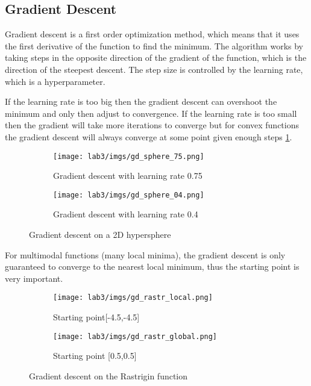 \subsection{Gradient Descent}
\label{sec:gradient-descent}
Gradient descent is a first order optimization method, which means that it uses the first derivative of the function to find the minimum. The algorithm works by taking steps in the opposite direction of the gradient of the function, which is the direction of the steepest descent. The step size is controlled by the learning rate, which is a hyperparameter.

If the learning rate is too big then the gradient descent can overshoot the minimum and only then adjust to convergence. If the learning rate is too small then the gradient will take more iterations to converge but for convex functions the gradient descent will always converge at some point given enough steps \ref{fig:gd-hypersphere}.

\begin{figure}[H]
    \begin{subfigure}{0.5\linewidth}
        \texttt{[image: lab3/imgs/gd\_sphere\_75.png]}
        \caption{Gradient descent with learning rate 0.75}
    \end{subfigure}
    \begin{subfigure}{0.5\linewidth}
        \texttt{[image: lab3/imgs/gd\_sphere\_04.png]}
        \caption{Gradient descent with learning rate 0.4}
    \end{subfigure}
    \caption{Gradient descent on a 2D hypersphere}
    \label{fig:gd-hypersphere}
\end{figure}

For multimodal functions (many local minima), the gradient descent is only guaranteed to converge to the nearest local minimum, thus the starting point is very important.
\begin{figure}[H]
    \begin{subfigure}{0.5\linewidth}
        \texttt{[image: lab3/imgs/gd\_rastr\_local.png]}
        \caption{Starting point[-4.5,-4.5]}
    \end{subfigure}
    \begin{subfigure}{0.5\linewidth}
        \texttt{[image: lab3/imgs/gd\_rastr\_global.png]}
        \caption{Starting point [0.5,0.5]}
    \end{subfigure}
    \caption{Gradient descent on the Rastrigin function}
    \label{fig:gd-rastr}
\end{figure}

